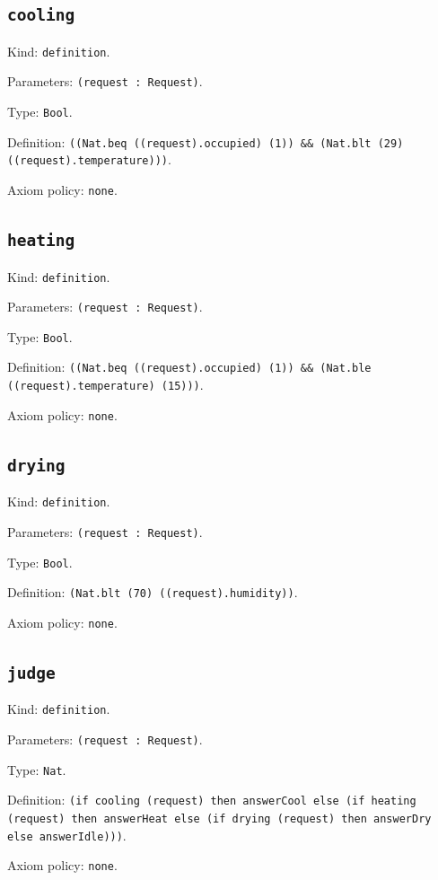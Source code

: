 \documentclass[11pt]{article}
\begin{document}
\subsection*{\texttt{cooling}}
\noindent Kind: \texttt{definition}.\par
\noindent Parameters: \texttt{(request : Request)}.\par
\noindent Type: \texttt{Bool}.\par
\noindent Definition: \texttt{((Nat.beq ((request).occupied) (1)) \&\& (Nat.blt (29) ((request).temperature)))}.\par
\noindent Axiom policy: \texttt{none}.\par
\subsection*{\texttt{heating}}
\noindent Kind: \texttt{definition}.\par
\noindent Parameters: \texttt{(request : Request)}.\par
\noindent Type: \texttt{Bool}.\par
\noindent Definition: \texttt{((Nat.beq ((request).occupied) (1)) \&\& (Nat.ble ((request).temperature) (15)))}.\par
\noindent Axiom policy: \texttt{none}.\par
\subsection*{\texttt{drying}}
\noindent Kind: \texttt{definition}.\par
\noindent Parameters: \texttt{(request : Request)}.\par
\noindent Type: \texttt{Bool}.\par
\noindent Definition: \texttt{(Nat.blt (70) ((request).humidity))}.\par
\noindent Axiom policy: \texttt{none}.\par
\subsection*{\texttt{judge}}
\noindent Kind: \texttt{definition}.\par
\noindent Parameters: \texttt{(request : Request)}.\par
\noindent Type: \texttt{Nat}.\par
\noindent Definition: \texttt{(if cooling (request) then answerCool else (if heating (request) then answerHeat else (if drying (request) then answerDry else answerIdle)))}.\par
\noindent Axiom policy: \texttt{none}.\par
\end{document}
